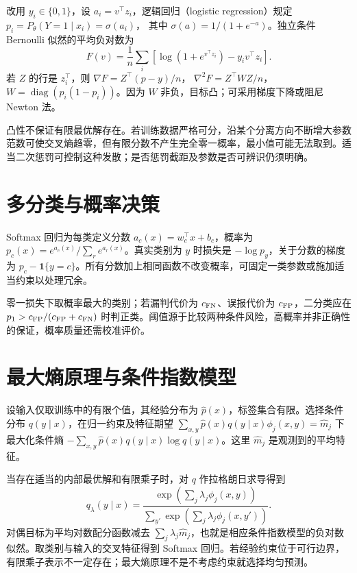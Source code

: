 改用 $y_i\in\{0,1\}$，设 $a_i=v^\top z_i$，逻辑回归（logistic regression）规定
$p_i=P_\theta(Y=1\mid x_i)=\sigma(a_i)$，
其中 $\sigma(a)=1/(1+e^{-a})$。独立条件 Bernoulli 似然的平均负对数为
\begin{equation}
 F(v)=\frac1n\sum_i[\log(1+e^{v^\top z_i})-y_iv^\top z_i].
 \label{eq:ml-logistic-objective}
\end{equation}
若 $Z$ 的行是 $z_i^\top$，则 $\nabla F=Z^\top(p-y)/n$，
$\nabla^2F=Z^\top WZ/n$，$W=\operatorname{diag}(p_i(1-p_i))$。因为 $W$ 非负，目标凸；可采用梯度下降或阻尼 Newton 法。

凸性不保证有限最优解存在。若训练数据严格可分，沿某个分离方向不断增大参数范数可使交叉熵趋零，但有限分数不产生完全零一概率，最小值可能无法取到。适当二次惩罚可控制这种发散；是否惩罚截距及参数是否可辨识仍须明确。

\section{多分类与概率决策}

Softmax 回归为每类定义分数 $a_c(x)=w_c^\top x+b_c$，概率为 $p_c(x)=e^{a_c(x)}/\sum_re^{a_r(x)}$。真实类别为 $y$ 时损失是 $-\log p_y$，关于分数的梯度为 $p_c-\mathbf1\{y=c\}$。所有分数加上相同函数不改变概率，可固定一类参数或施加适当约束以处理冗余。

零一损失下取概率最大的类别；若漏判代价为 $c_{\rm FN}$、误报代价为 $c_{\rm FP}$，二分类应在
$p_1>c_{\rm FP}/(c_{\rm FP}+c_{\rm FN})$
时判正类。阈值源于比较两种条件风险，高概率并非正确性的保证，概率质量还需校准评价。

\section{最大熵原理与条件指数模型}

设输入仅取训练中的有限个值，其经验分布为 $\widehat p(x)$，标签集合有限。选择条件分布 $q(y\mid x)$，在归一约束及特征期望
$\sum_{x,y}\widehat p(x)q(y\mid x)\phi_j(x,y)=\widehat m_j$
下最大化条件熵 $-\sum_{x,y}\widehat p(x)q(y\mid x)\log q(y\mid x)$。这里 $\widehat m_j$ 是观测到的平均特征。

当存在适当的内部最优解和有限乘子时，对 $q$ 作拉格朗日求导得到
\[
 q_\lambda(y\mid x)=
 \frac{\exp(\sum_j\lambda_j\phi_j(x,y))}
 {\sum_{y'}\exp(\sum_j\lambda_j\phi_j(x,y'))}.
\]
对偶目标为平均对数配分函数减去 $\sum_j\lambda_j\widehat m_j$，也就是相应条件指数模型的负对数似然。取类别与输入的交叉特征得到 Softmax 回归。若经验约束位于可行边界，有限乘子表示不一定存在；最大熵原理不是不考虑约束就选择均匀预测。

